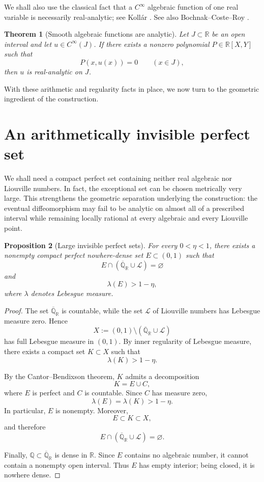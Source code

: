\documentclass[11pt,reqno]{amsart}
\numberwithin{equation}{section}
\newtheorem{theorem}{Theorem}[section]
\newtheorem{proposition}[theorem]{Proposition}
\theoremstyle{definition}
\theoremstyle{remark}
\newcommand{\R}{\mathbb R}
\newcommand{\Q}{\mathbb Q}
\newcommand{\Ralg}{\overline{\mathbb Q}_{\mathbb R}}
\newcommand{\Lio}{\mathscr L}
\begin{document}
We shall also use the classical fact that a $C^\infty$ algebraic
function of one real variable is necessarily real-analytic; see
Koll\'ar \cite[p.~312, Remark following Definition~9]{Kollar2017}.
See also Bochnak--Coste--Roy \cite[\S8.1]{BCR1998}.


\begin{theorem}[Smooth algebraic functions are analytic]\label{thm:smooth-algebraic}
Let $J\subset\R$ be an open interval and let $u\in C^\infty(J)$. If there exists a nonzero polynomial $P\in\R[X,Y]$ such that
\[
P(x,u(x))=0
\qquad(x\in J),
\]
then $u$ is real-analytic on $J$.
\end{theorem}

With these arithmetic and regularity facts in place, we now turn to the geometric ingredient of the construction.

\section{An arithmetically invisible perfect set}\label{sec:invisible}

We shall need a compact perfect set containing neither real algebraic nor
Liouville numbers. In fact, the exceptional set can be chosen metrically
very large. This strengthens the geometric separation underlying the
construction: the eventual diffeomorphism may fail to be analytic on
almost all of a prescribed interval while remaining locally rational at
every algebraic and every Liouville point.

\begin{proposition}[Large invisible perfect sets]\label{prop:invisible}
For every $0<\eta<1$, there exists a nonempty compact perfect
nowhere-dense set $E\subset(0,1)$ such that
\[
E\cap(\Ralg\cup\Lio)=\varnothing
\]
and
\[
\lambda(E)>1-\eta,
\]
where $\lambda$ denotes Lebesgue measure.
\end{proposition}

\begin{proof}
The set $\Ralg$ is countable, while the set $\Lio$ of Liouville numbers
has Lebesgue measure zero. Hence
\[
X:=(0,1)\setminus(\Ralg\cup\Lio)
\]
has full Lebesgue measure in $(0,1)$. By inner regularity of Lebesgue
measure, there exists a compact set $K\subset X$ such that
\[
\lambda(K)>1-\eta.
\]

By the Cantor--Bendixson theorem, $K$ admits a decomposition
\[
K=E\cup C,
\]
where $E$ is perfect and $C$ is countable. Since $C$ has measure zero,
\[
\lambda(E)=\lambda(K)>1-\eta.
\]
In particular, $E$ is nonempty. Moreover,
\[
E\subset K\subset X,
\]
and therefore
\[
E\cap(\Ralg\cup\Lio)=\varnothing.
\]

Finally, $\Q\subset\Ralg$ is dense in $\R$. Since $E$ contains no
algebraic number, it cannot contain a nonempty open interval. Thus $E$
has empty interior; being closed, it is nowhere dense.
\end{proof}
\end{document}
